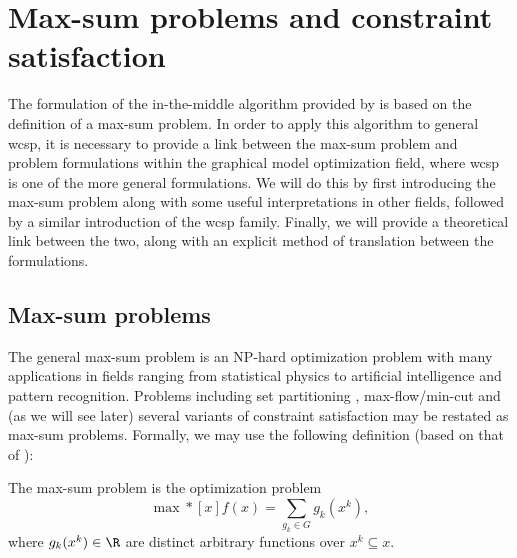 \section{Max-sum problems and constraint satisfaction}
The formulation of the in-the-middle algorithm provided by \textcite{Wedelin08} is based on the definition of a max-sum problem.
In order to apply this algorithm to general \gls{wcsp}, it is necessary to provide a link between the max-sum problem and problem formulations within the graphical model optimization field, where \gls{wcsp} is one of the more general formulations.
We will do this by first introducing the max-sum problem along with some useful interpretations in other fields, followed by a similar introduction of the \gls{wcsp} family.
Finally, we will provide a theoretical link between the two, along with an explicit method of translation between the formulations.

\subsection{Max-sum problems}
The general max-sum problem is an NP-hard optimization problem with many applications in fields ranging from statistical physics to artificial intelligence and pattern recognition.
Problems including set partitioning \parencite[\pno~107]{Wedelin08}, max-flow/min-cut and (as we will see later) several variants of constraint satisfaction may be restated as max-sum problems.
Formally, we may use the following definition (based on that of \citeauthor{Wedelin08}):
\begin{definition} \label{def:max-sum}
	The max-sum problem is the optimization problem
	\begin{equation*}
		\max*[x] f(x) = \sum_{g_k\in G} g_k(x^k),
	\end{equation*}
	where \(g_k(x^k) \in \R\) are distinct arbitrary functions over \(x^k \subseteq x\).
\end{definition}

